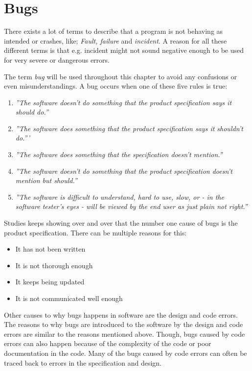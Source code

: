 \section{Bugs}
There exists a lot of terms to describe that a program is not behaving as intended or crashes, like; \textit{Fault, failure} and \textit{incident}.
A reason for all these different terms is that e.g. incident might not sound negative enough to be used for very severe or dangerous errors. \cite{SoftwareTesting}

The term \textit{bug} will be used throughout this chapter to avoid any confusions or even misunderstandings.
A bug occurs when one of these five rules is true: \cite{SoftwareTesting} %

\begin{enumerate}
	\item \textit{''The software doesn't do something that the product specification says it should do.''}
	\item \textit{''The software does something that the product specification says it shouldn't do.'''}
	\item \textit{''The software does something that the specification doesn't mention.''}
	\item \textit{''The software doesn't do something that the product specification doesn't mention but should.''}
	\item \textit{''The software is difficult to understand, hard to use, slow, or - in the software tester's eyes - will be viewed by the end user as just plain not right.''}
\end{enumerate}

Studies keeps showing over and over that the number one cause of bugs is the product specification.
There can be multiple reasons for this: \cite{SoftwareTesting}

\begin{itemize}
	\item It has not been written
	\item It is not thorough enough
	\item It keeps being updated
	\item It is not communicated well enough
\end{itemize}

Other causes to why bugs happens in software are the design and code errors.
The reasons to why bugs are introduced to the software by the design and code errors are similar to the reasons mentioned above.
Though, bugs caused by code errors can also happen because of the complexity of the code or poor documentation in the code.
Many of the bugs caused by code errors can often be traced back to errors in the specification and design. \cite{SoftwareTesting}

